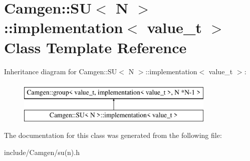 \hypertarget{a00286}{\section{Camgen\-:\-:S\-U$<$ N $>$\-:\-:implementation$<$ value\-\_\-t $>$ Class Template Reference}
\label{a00286}
}
Inheritance diagram for Camgen\-:\-:S\-U$<$ N $>$\-:\-:implementation$<$ value\-\_\-t $>$\-:\begin{figure}[H]
\begin{center}
\leavevmode
\includegraphics[height=2.000000cm]{a00286}
\end{center}
\end{figure}


The documentation for this class was generated from the following file\-:\begin{DoxyCompactItemize}
\item 
include/\-Camgen/su(n).\-h\end{DoxyCompactItemize}
